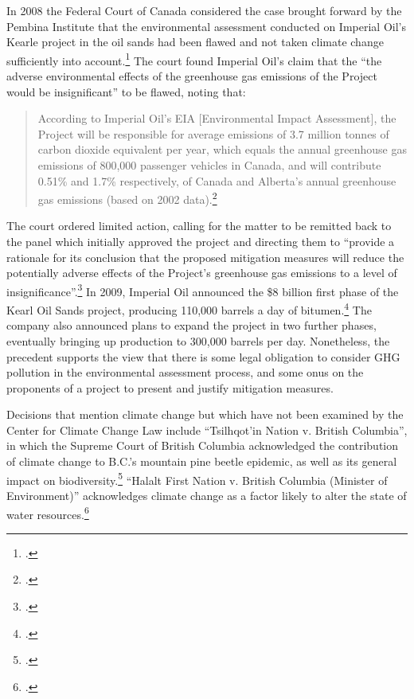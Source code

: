 \documentclass[10pt]{article}
\begin{document}
In 2008 the Federal Court of Canada considered the case brought forward by the Pembina Institute that the environmental assessment conducted on Imperial Oil's Kearle project in the oil sands had been flawed and not taken climate change sufficiently into account.\footcite[][p. 116]{ColumbiaIntl}
The court found Imperial Oil's claim that the ``the adverse environmental effects of the greenhouse gas emissions of the Project would be insignificant'' to be flawed, noting that:
\begin{quote}
According to Imperial Oil’s EIA [Environmental Impact Assessment], the Project will be responsible for average emissions of 3.7 million tonnes of carbon dioxide equivalent per year, which equals the annual greenhouse gas emissions of 800,000 passenger vehicles in Canada, and will contribute 0.51\% and 1.7\% respectively, of Canada and Alberta’s annual greenhouse gas emissions (based on 2002 data).\footcite[][]{PembinaAG2008}
\end{quote}
The court ordered limited action, calling for the matter to be remitted back to the panel which initially approved the project and directing them to ``provide a rationale for its conclusion that the proposed mitigation measures will reduce the potentially adverse effects of the Project’s greenhouse gas emissions to a level of insignificance''.\footcite[][]{PembinaAG2008}
In 2009, Imperial Oil announced the \$8 billion first phase of the Kearl Oil Sands project, producing 110,000 barrels a day of bitumen.\footcite[][]{KearlApproved}
The company also announced plans to expand the project in two further phases, eventually bringing up production to 300,000 barrels per day.
Nonetheless, the precedent supports the view that there is some legal obligation to consider GHG pollution in the environmental assessment process, and some onus on the proponents of a project to present and justify mitigation measures.



Decisions that mention climate change but which have not been examined by the Center for Climate Change Law include ``Tsilhqot'in Nation v. British Columbia'', in which the Supreme Court of British Columbia acknowledged the contribution of climate change to B.C.'s mountain pine beetle epidemic, as well as its general impact on biodiversity.\footcite[][p. 358, 406]{Tsilhqotin}
``Halalt First Nation v. British Columbia (Minister of Environment)'' acknowledges climate change as a factor likely to alter the state of water resources.\footcite[][]{Halalt}
\end{document}
